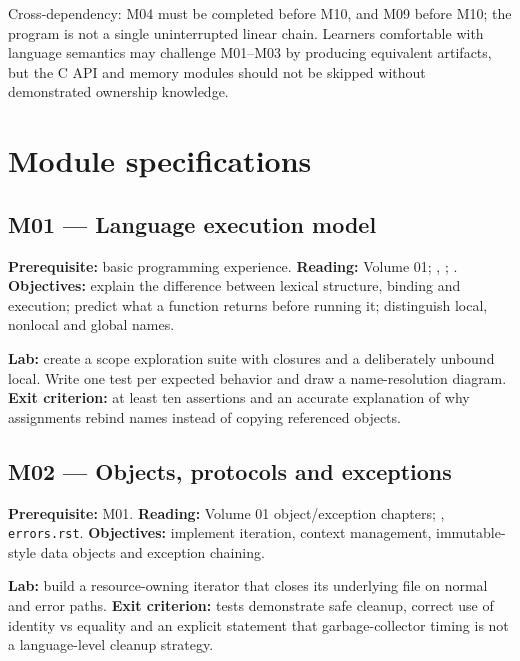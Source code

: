 \documentclass[
  11pt,
]{report}
\newcommand{\passthrough}[1]{#1}
\begin{document}
Cross-dependency: M04 must be completed before M10, and M09 before M10;
the program is not a single uninterrupted linear chain. Learners
comfortable with language semantics may challenge M01--M03 by producing
equivalent artifacts, but the C API and memory modules should not be
skipped without demonstrated ownership knowledge.

\chapter{Module specifications}\label{module-specifications}

\section{M01 --- Language execution
model}\label{m01-language-execution-model}

\textbf{Prerequisite:} basic programming experience. \textbf{Reading:}
Volume 01;
,
;
.
\textbf{Objectives:} explain the difference between lexical structure,
binding and execution; predict what a function returns before running
it; distinguish local, nonlocal and global names.

\textbf{Lab:} create a scope exploration suite with closures and a
deliberately unbound local. Write one test per expected behavior and
draw a name-resolution diagram. \textbf{Exit criterion:} at least ten
assertions and an accurate explanation of why assignments rebind names
instead of copying referenced objects.

\section{M02 --- Objects, protocols and
exceptions}\label{m02-objects-protocols-and-exceptions}

\textbf{Prerequisite:} M01. \textbf{Reading:} Volume 01 object/exception
chapters; ,
\passthrough{\lstinline!errors.rst!}. \textbf{Objectives:} implement
iteration, context management, immutable-style data objects and
exception chaining.

\textbf{Lab:} build a resource-owning iterator that closes its
underlying file on normal and error paths. \textbf{Exit criterion:}
tests demonstrate safe cleanup, correct use of identity vs equality and
an explicit statement that garbage-collector timing is not a
language-level cleanup strategy.
\end{document}
